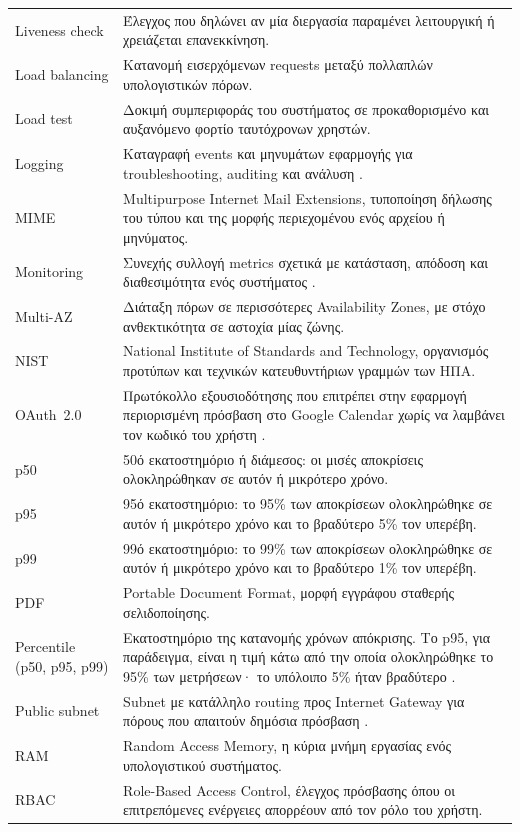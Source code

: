 \documentclass[12pt,a4paper,twoside,fleqn]{book}
\begin{document}
\begin{longtable}{@{}p{3.8cm}p{9.2cm}@{}}
Liveness check & Έλεγχος που δηλώνει αν μία διεργασία παραμένει λειτουργική ή χρειάζεται επανεκκίνηση.\\
Load balancing & Κατανομή εισερχόμενων requests μεταξύ πολλαπλών υπολογιστικών πόρων.\\
Load test & Δοκιμή συμπεριφοράς του συστήματος σε προκαθορισμένο και αυξανόμενο φορτίο ταυτόχρονων χρηστών.\\
Logging & Καταγραφή events και μηνυμάτων εφαρμογής για troubleshooting, auditing και ανάλυση \cite{aws2026cloudwatch}.\\
MIME & Multipurpose Internet Mail Extensions, τυποποίηση δήλωσης του τύπου και της μορφής περιεχομένου ενός αρχείου ή μηνύματος.\\
Monitoring & Συνεχής συλλογή metrics σχετικά με κατάσταση, απόδοση και διαθεσιμότητα ενός συστήματος \cite{aws2026cloudwatch}.\\
Multi-AZ & Διάταξη πόρων σε περισσότερες Availability Zones, με στόχο ανθεκτικότητα σε αστοχία μίας ζώνης.\\
NIST & National Institute of Standards and Technology, οργανισμός προτύπων και τεχνικών κατευθυντήριων γραμμών των ΗΠΑ.\\
OAuth~2.0 & Πρωτόκολλο εξουσιοδότησης που επιτρέπει στην εφαρμογή περιορισμένη πρόσβαση στο Google Calendar χωρίς να λαμβάνει τον κωδικό του χρήστη \cite{rfc6749}.\\
p50 & 50ό εκατοστημόριο ή διάμεσος: οι μισές αποκρίσεις ολοκληρώθηκαν σε αυτόν ή μικρότερο χρόνο.\\
p95 & 95ό εκατοστημόριο: το 95\% των αποκρίσεων ολοκληρώθηκε σε αυτόν ή μικρότερο χρόνο και το βραδύτερο 5\% τον υπερέβη.\\
p99 & 99ό εκατοστημόριο: το 99\% των αποκρίσεων ολοκληρώθηκε σε αυτόν ή μικρότερο χρόνο και το βραδύτερο 1\% τον υπερέβη.\\
PDF & Portable Document Format, μορφή εγγράφου σταθερής σελιδοποίησης.\\
Percentile (p50, p95, p99) & Εκατοστημόριο της κατανομής χρόνων απόκρισης. Το p95, για παράδειγμα, είναι η τιμή κάτω από την οποία ολοκληρώθηκε το 95\% των μετρήσεων· το υπόλοιπο 5\% ήταν βραδύτερο \cite{grafana2026k6thresholds}.\\
Public subnet & Subnet με κατάλληλο routing προς Internet Gateway για πόρους που απαιτούν δημόσια πρόσβαση \cite{aws2026vpc}.\\
RAM & Random Access Memory, η κύρια μνήμη εργασίας ενός υπολογιστικού συστήματος.\\
RBAC & Role-Based Access Control, έλεγχος πρόσβασης όπου οι επιτρεπόμενες ενέργειες απορρέουν από τον ρόλο του χρήστη.\\

\end{longtable}
\end{document}
